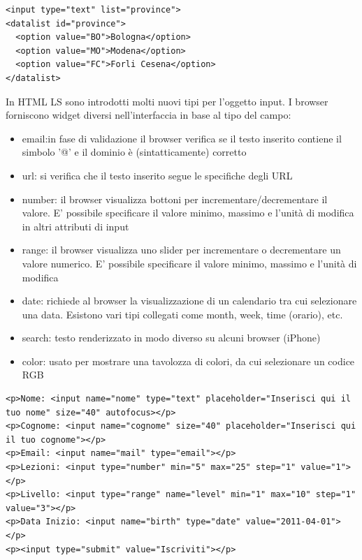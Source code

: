 \documentclass[a4paper,12pt]{article}
\begin{document}
\begin{lstlisting}
<input type="text" list="province">
<datalist id="province">
  <option value="BO">Bologna</option>
  <option value="MO">Modena</option>
  <option value="FC">Forli Cesena</option>
</datalist>
\end{lstlisting}
In HTML LS sono introdotti molti nuovi tipi per l’oggetto input. I browser forniscono widget diversi nell’interfaccia in base al tipo del campo:
\begin{itemize}
  \item email:in fase di validazione il browser verifica se il testo inserito contiene il simbolo '@’ e il dominio è (sintatticamente) corretto
  \item url: si verifica che il testo inserito segue le specifiche degli URL
  \item number: il browser visualizza bottoni per incrementare/decrementare il valore. E’ possibile specificare il valore minimo, massimo e l’unità di modifica in altri attributi di input
  \item range: il browser visualizza uno slider per incrementare o decrementare un valore numerico. E’ possibile specificare il valore minimo, massimo e l’unità di modifica
  \item date: richiede al browser la visualizzazione di un calendario tra cui selezionare una data. Esistono vari tipi collegati come month, week, time (orario), etc.
  \item search: testo renderizzato in modo diverso su alcuni browser (iPhone)
  \item color: usato per mostrare una tavolozza di colori, da cui selezionare un codice RGB
\end{itemize}
\begin{lstlisting}
<p>Nome: <input name="nome" type="text" placeholder="Inserisci qui il tuo nome" size="40" autofocus></p>
<p>Cognome: <input name="cognome" size="40" placeholder="Inserisci qui il tuo cognome"></p>
<p>Email: <input name="mail" type="email"></p>
<p>Lezioni: <input type="number" min="5" max="25" step="1" value="1"></p>
<p>Livello: <input type="range" name="level" min="1" max="10" step="1" value="3"></p>
<p>Data Inizio: <input name="birth" type="date" value="2011-04-01"></p>
<p><input type="submit" value="Iscriviti"></p>
\end{lstlisting}
\end{document}

